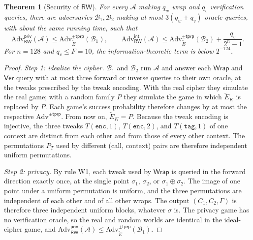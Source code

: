 \documentclass[11pt]{article}
\newtheorem{theorem}{Theorem}
\theoremstyle{remark}
\begin{document}
\begin{theorem}[Security of $\mathsf{RW}$]
\label{thm:rw}
For every $\mathcal{A}$ making $q_w$ wrap and $q_v$ verification queries, there are adversaries $\mathcal{B}_1, \mathcal{B}_2$ making at most $3(q_w + q_v)$ oracle queries, with about the same running time, such that
\[
\mathrm{Adv}^{\mathsf{priv}}_{\mathsf{RW}}(\mathcal{A}) \le \mathrm{Adv}^{\pm\mathsf{tprp}}_{\widetilde{E}}(\mathcal{B}_1),
\qquad
\mathrm{Adv}^{\mathsf{int}}_{\mathsf{RW}}(\mathcal{A}) \le \mathrm{Adv}^{\pm\mathsf{tprp}}_{\widetilde{E}}(\mathcal{B}_2) + \frac{q_v}{2^{n}-1}.
\]
For $n = 128$ and $q_v \le F = 10$, the information-theoretic term is below $2^{-124}$.
\end{theorem}
\begin{proof}
\emph{Step 1: idealize the cipher.} $\mathcal{B}_1$ and $\mathcal{B}_2$ run $\mathcal{A}$ and answer each $\mathsf{Wrap}$ and $\mathsf{Ver}$ query with at most three forward or inverse queries to their own oracle, at the tweaks prescribed by the tweak encoding. With the real cipher they simulate the real game; with a random family $P$ they simulate the game in which $\widetilde{E}_K$ is replaced by $P$. Each game's success probability therefore changes by at most the respective $\mathrm{Adv}^{\pm\mathsf{tprp}}$. From now on, $\widetilde{E}_K = P$. Because the tweak encoding is injective, the three tweaks $T(\mathtt{enc},1)$, $T(\mathtt{enc},2)$, and $T(\mathtt{tag},1)$ of one context are distinct from each other and from those of every other context. The permutations $P_{T}$ used by different (call, context) pairs are therefore independent uniform permutations.

\emph{Step 2: privacy.} By rule W1, each tweak used by $\mathsf{Wrap}$ is queried in the forward direction exactly once, at the single point $\sigma_1$, $\sigma_2$, or $\sigma_1 \oplus \sigma_2$. The image of one point under a uniform permutation is uniform, and the three permutations are independent of each other and of all other wraps. The output $(C_1, C_2, \Gamma)$ is therefore three independent uniform blocks, whatever $\sigma$ is. The privacy game has no verification oracle, so the real and random worlds are identical in the ideal-cipher game, and $\mathrm{Adv}^{\mathsf{priv}}_{\mathsf{RW}}(\mathcal{A}) \le \mathrm{Adv}^{\pm\mathsf{tprp}}_{\widetilde{E}}(\mathcal{B}_1)$.


\end{proof}
\end{document}
